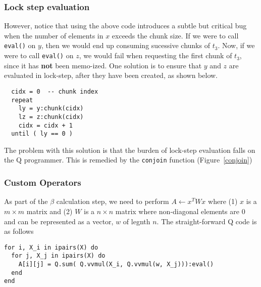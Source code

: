 \begin{figure}
\centering
{}
\end{figure}


\subsubsection{Lock step evaluation}
However, notice that using the above code introduces a subtle but
critical bug when the number of elements in \(x\) exceeds the chunk
size.  If we were to call {\tt eval()} on \(y\), then we would
end up consuming sucessive chunks of \(t_3\). Now, if we were to call
{\tt eval()} on \(z\), we would fail when requesting the first
chunk of \(t_3\), since it has {\bf not} been memo-ized. One solution
is to ensure that \(y\) and \(z\) are evaluated in lock-step, after they have
been created, as shown below.
\begin{verbatim} 
  cidx = 0  -- chunk index
  repeat 
    ly = y:chunk(cidx)
    lz = z:chunk(cidx)
    cidx = cidx + 1
  until ( ly == 0 )
\end{verbatim}

The problem with this solution is that the burden of lock-step evaluation falls
on the Q programmer. This is remedied by the {\tt conjoin} function
(Figure~\ref{conjoin})

\begin{figure}
\centering
{}
\end{figure}

\subsubsection{Custom Operators}

As part of the \(\beta\) calculation step, we need to perform \(A \leftarrow x^T
W x\) where (1) 
\(x\) is a \(m \times m\) matrix and (2) \(W\) is a \(n \times n\) matrix where
non-diagonal elements are 0 and can be represented as a vector, \(w\) of legnth
\(n\).
The straight-forward Q code is as follows
\begin{verbatim}
for i, X_i in ipairs(X) do
  for j, X_j in ipairs(X) do
    A[i][j] = Q.sum( Q.vvmul(X_i, Q.vvmul(w, X_j))):eval()
  end
end
\end{verbatim}

